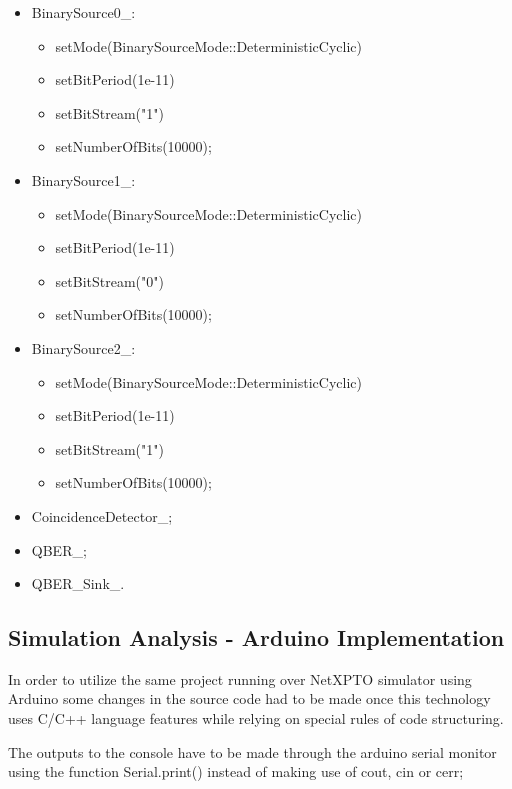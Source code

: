 \begin{refsection}
\begin{itemize}
	\item BinarySource0\_:
	\begin{itemize}
		\item setMode(BinarySourceMode::DeterministicCyclic)
		\item setBitPeriod(1e-11)
		\item setBitStream("1")
		\item setNumberOfBits(10000);
	\end{itemize}
	\clearpage
	\item BinarySource1\_:
	\begin{itemize}
		\item setMode(BinarySourceMode::DeterministicCyclic)
		\item setBitPeriod(1e-11)
		\item setBitStream("0")
		\item setNumberOfBits(10000);
	\end{itemize}
	
	\item BinarySource2\_:
	\begin{itemize}
		\item setMode(BinarySourceMode::DeterministicCyclic)
		\item setBitPeriod(1e-11)
		\item setBitStream("1")
		\item setNumberOfBits(10000);
	\end{itemize}
	
	\item CoincidenceDetector\_;
	
	\item QBER\_;
	
	\item QBER\_Sink\_.
\end{itemize}





\subsection{Simulation Analysis - Arduino Implementation}

In order to utilize the same project running over NetXPTO simulator using Arduino some changes in the source code had to be made once this technology uses C/C++ language features while relying on special rules of code structuring.

The outputs to the console have to be made through the arduino serial monitor using the function Serial.print() instead of making use of cout, cin or cerr; 


\end{refsection}
